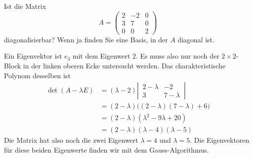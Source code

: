 Ist die Matrix
\[
A=
\begin{pmatrix}
2&-2&0\\
3& 7&0\\
0& 0&2
\end{pmatrix}
\]
diagonalisierbar? Wenn ja finden Sie eine Basis, in der $A$ diagonal ist.

\begin{loesung}
Ein Eigenvektor ist $e_3$ mit dem Eigenwert $2$. Es muss also nur noch
der $2\times 2$-Block in der linken oberen Ecke untersucht werden.
Das charakteristische Polynom desselben ist
\begin{align*}
\det(A-\lambda E)
&=
(\lambda -2)\left|\,\begin{matrix}2-\lambda&-2\\3&7-\lambda\end{matrix}\,\right|
\\
&=(2-\lambda)\bigl( (2-\lambda)(7-\lambda)+6 \bigr)
\\
&=(2-\lambda)(\lambda^2-9\lambda+20)
\\
&=(2-\lambda)(\lambda-4)(\lambda -5)
\end{align*}
Die Matrix hat also noch die zwei Eigenwert $\lambda=4$ und $\lambda=5$.
Die Eigenvektoren für diese beiden Eigenwerte finden wir mit dem
Gauss-Algorithmus.


\end{loesung}
